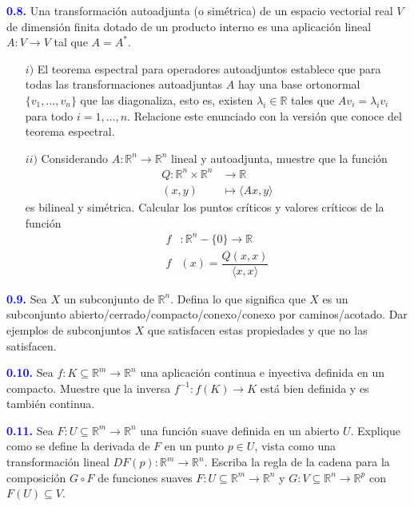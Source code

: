 \documentclass[oneside,11pt]{memoir}
\begin{document}
\textcolor{blue}{\textbf{0.8.}} Una transformación autoadjunta (o simétrica) de un espacio vectorial real $V$
de dimensión finita dotado de un producto interno es una aplicación lineal $A:V\to V$ tal que $A=A^*$.
\begin{enumerate}
    \item[$i)$] El teorema espectral para operadores autoadjuntos establece que para todas las transformaciones
 autoadjuntas $A$ hay una base ortonormal $\{v_1,\ldots,v_n\}$ que las diagonaliza, esto es, existen $\lambda_i\in \mathbb{R}$ tales que $Av_i=\lambda_iv_i$ para todo $i=1,\ldots,n$. Relacione este enunciado con la versión que conoce del teorema espectral.
    \item[$ii)$] Considerando $A:\mathbb{R}^n\to \mathbb{R}^n$ lineal y autoadjunta, muestre que la función 
    \begin{align*}
        Q:\mathbb{R}^n\times \mathbb{R}^n&\to \mathbb{R}\\
        (x,y)&\mapsto \langle Ax, y\rangle 
    \end{align*}
    es bilineal y simétrica. Calcular los puntos críticos y valores críticos de la función
    \begin{align*}
        f&:\mathbb{R}^n-\{0\}\to \mathbb{R}\\
        f&(x)= \dfrac{Q(x,x)}{\langle x,x\rangle}
    \end{align*}
\end{enumerate}

\textcolor{blue}{\textbf{0.9.}} Sea $X$ un subconjunto de $\mathbb{R}^n$. Defina lo que significa que $X$ es un subconjunto
abierto/cerrado/compacto/conexo/conexo por caminos/acotado. Dar ejemplos de
subconjuntos $X$ que satisfacen estas propiedades y que no las satisfacen.

\textcolor{blue}{\textbf{0.10.}} Sea $f:K\subseteq \mathbb{R}^m\to \mathbb{R}^n$ una aplicación continua e inyectiva definida en un compacto. Muestre que la inversa $f^{-1}:f(K)\to K$ está bien definida y es también continua.

\textcolor{blue}{\textbf{0.11.}} Sea $F:U\subseteq \mathbb{R}^m\to \mathbb{R}^n$ una función suave definida en un abierto $U$. Explique como se define la derivada de $F$ en un punto $p\in U$, vista como una transformación lineal $DF(p):\mathbb{R}^m\to \mathbb{R}^n$. Escriba la regla de la cadena para la composición $G\circ F$ de funciones suaves $F:U\subseteq \mathbb{R}^m\to \mathbb{R}^n$ y $G:V\subseteq \mathbb{R}^n\to \mathbb{R}^p$ con $F(U)\subseteq V$.
\end{document}
